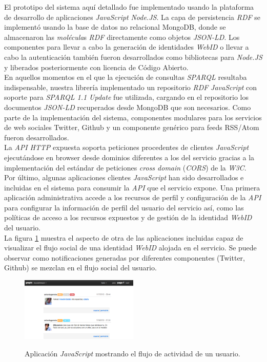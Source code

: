 El prototipo del sistema aqu\'i detallado fue implementado usando la plataforma de desarrollo de aplicaciones \textit{JavaScript} \textit{Node.JS}. La capa de persistencia \textit{RDF} se implement\'o usando la base de datos no relacional MongoDB, donde se almacenaron las \textit{mol\'ecula}s \textit{RDF} directamente como objetos \textit{JSON-LD}. Los componentes para llevar a cabo la generaci\'on de identidades \textit{WebID} o llevar a cabo la autenticaci\'on tambi\'en fueron desarrollados como bibliotecas para \textit{Node.JS} y liberados posteriormente con licencia de C\'odigo Abierto.\\
En aquellos momentos en el que la ejecuci\'on de consultas \textit{SPARQL} resultaba indispensable, nuestra librer\'ia implementado un repositorio \textit{RDF} \textit{JavaScript} con soporte para \textit{SPARQL 1.1 Update} fue utilizada, cargando en el repositorio los documentos \textit{JSON-LD} recuperados desde MongoDB que son necesarios.
Como parte de la implementaci\'on del sistema, componentes modulares para los servicios de web sociales Twitter, Github y un componente gen\'erico para feeds RSS/Atom fueron desarrollados.\\
La \textit{API} \textit{HTTP} expuesta soporta peticiones procedentes de clientes \textit{JavaScript} ejecut\'andose en browser desde dominios diferentes a los del servicio gracias a la implementaci\'on del est\'andar de peticiones \textit{cross domain} (\textit{CORS}) \cite{cors} de la \textit{W3C}.\\
Por \'ultimo, algunas aplicaciones clientes \textit{JavaScript} han sido desarrollados e incluidas en el sistema para consumir la \textit{API} que el servicio expone. Una primera aplicaci\'on administrativa accede a los recursos de perfil y configuraci\'on de la \textit{API} para configurar la informaci\'on de perfil del usuario del servicio as\'i, como las pol\'iticas de acceso a los recursos expuestos y de gesti\'on de la identidad \textit{WebID} del usuario.\\
La figura \ref{figura6} muestra el aspecto de otra de las aplicaciones incluidas capaz de visualizar el flujo social de una identidad \textit{WebID} alojada en el servicio. Se puede observar como notificaciones generadas por diferentes componentes (Twitter, Github) se mezclan en el flujo social del usuario. \\

\begin{figure}
\vspace{2.4in}
\caption{Aplicaci\'on \textit{JavaScript} mostrando el flujo de actividad de un usuario.}
\includegraphics[width=0.5\textwidth]{figura6}
\label{figura6}
\end{figure}


